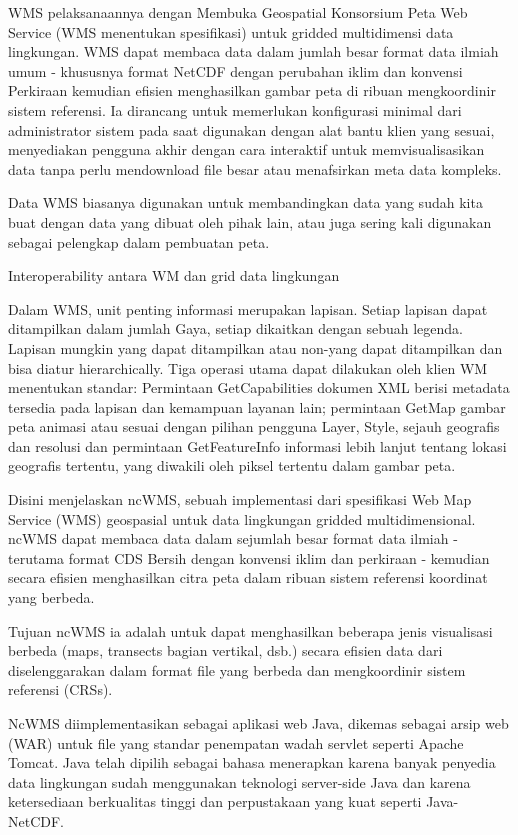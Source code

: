    WMS pelaksanaannya dengan Membuka Geospatial Konsorsium Peta Web Service (WMS menentukan spesifikasi) untuk gridded multidimensi data lingkungan. WMS dapat membaca data dalam jumlah besar format data ilmiah umum - khususnya format NetCDF dengan perubahan iklim dan konvensi Perkiraan kemudian efisien menghasilkan gambar peta di ribuan mengkoordinir sistem referensi. Ia dirancang untuk memerlukan konfigurasi minimal dari administrator sistem pada saat digunakan dengan alat bantu klien yang sesuai, menyediakan pengguna akhir dengan cara interaktif untuk memvisualisasikan data tanpa perlu mendownload file besar atau menafsirkan meta data kompleks. 

Data WMS biasanya digunakan untuk membandingkan data yang sudah kita buat dengan data yang dibuat oleh pihak lain, atau juga sering kali
digunakan sebagai pelengkap dalam pembuatan peta.

Interoperability antara WM dan grid data lingkungan

Dalam WMS, unit penting informasi merupakan lapisan. Setiap lapisan dapat ditampilkan dalam jumlah Gaya, setiap dikaitkan dengan sebuah
legenda. Lapisan mungkin yang dapat ditampilkan atau non-yang dapat ditampilkan dan bisa diatur hierarchically. Tiga operasi utama dapat
dilakukan oleh klien WM menentukan standar: Permintaan GetCapabilities dokumen XML berisi metadata tersedia pada lapisan dan kemampuan
layanan lain; permintaan GetMap gambar peta animasi atau sesuai dengan pilihan pengguna Layer, Style, sejauh geografis dan resolusi dan
permintaan GetFeatureInfo informasi lebih lanjut tentang lokasi geografis tertentu, yang diwakili oleh piksel tertentu dalam gambar
peta.

Disini menjelaskan ncWMS, sebuah implementasi dari spesifikasi Web Map Service (WMS) geospasial untuk data lingkungan gridded
multidimensional. ncWMS dapat membaca data dalam sejumlah besar format data ilmiah - terutama format CDS Bersih dengan konvensi iklim 
dan perkiraan - kemudian secara efisien menghasilkan citra peta dalam ribuan sistem referensi koordinat yang berbeda.

Tujuan ncWMS ia adalah untuk dapat menghasilkan beberapa jenis visualisasi berbeda (maps, transects bagian vertikal, dsb.) secara
efisien data dari diselenggarakan dalam format file yang berbeda dan mengkoordinir sistem referensi (CRSs).

NcWMS diimplementasikan sebagai aplikasi web Java, dikemas sebagai arsip web (WAR) untuk file yang standar penempatan wadah servlet
seperti Apache Tomcat. Java telah dipilih sebagai bahasa menerapkan karena banyak penyedia data lingkungan sudah menggunakan teknologi
server-side Java dan karena ketersediaan berkualitas tinggi dan perpustakaan yang kuat seperti Java-NetCDF.


